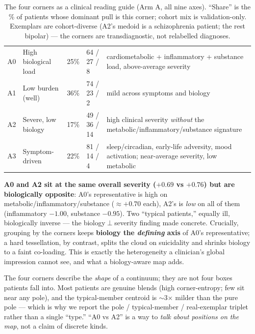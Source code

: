 \begin{table}[h]\centering\small\sffamily
\caption{The four corners as a clinical reading guide (Arm A, all nine axes). ``Share'' is the \% of patients
whose dominant pull is this corner; cohort mix is validation-only. Exemplars are cohort-diverse (A2's medoid is a
schizophrenia patient; the rest bipolar) --- the corners are transdiagnostic, not relabelled diagnoses.}
\label{tab:reading}
\begin{tabular}{L{0.5cm} L{3.4cm} R{1.0cm} L{2.6cm} L{5.4cm}}
\toprule
\hdr{} &  &  &  & \\
\midrule
{} A0 & High biological load & 25\% & 64 / 27 / 8 & cardiometabolic + inflammatory + substance load, above-average severity\\
A1 & Low burden (well) & 36\% & 74 / 23 / 2 & mild across symptoms and biology\\
 A2 & Severe, low biology & 17\% & 49 / 36 / 14 & high clinical severity \emph{without} the metabolic/inflammatory/substance signature\\
A3 & Symptom-driven & 22\% & 81 / 14 / 4 & sleep/circadian, early-life adversity, mood activation; near-average severity, low metabolic\\
\bottomrule
\end{tabular}
\end{table}

\begin{keyresult}
\textbf{A0 and A2 sit at the same overall severity ($+0.69$ vs $+0.76$) but are biologically opposite}: A0's
representative is high on metabolic/inflammatory/substance ($\approx +0.70$ each), A2's is \emph{low} on all of
them (inflammatory $-1.00$, substance $-0.95$). Two ``typical patients,'' equally ill, biologically inverse ---
the biology$\perp$severity finding made concrete. Crucially, grouping by the corners keeps \textbf{biology the
\emph{defining} axis} of A0's representative; a hard tessellation, by contrast, splits the cloud on suicidality
and shrinks biology to a faint co-loading. This is exactly the heterogeneity a clinician's global impression
cannot see, and what a biology-aware map adds.
\end{keyresult}

\begin{caveatbox}
The four corners describe the \emph{shape} of a continuum; they are not four boxes patients fall into. Most
patients are genuine blends (high corner-entropy; few sit near any pole), and the typical-member centroid is
$\sim$3$\times$ milder than the pure pole --- which is why we report the pole / typical-member / real-exemplar
triplet rather than a single ``type.'' ``A0 vs A2'' is a way to \emph{talk about positions on the map}, not a
claim of discrete kinds.
\end{caveatbox}


